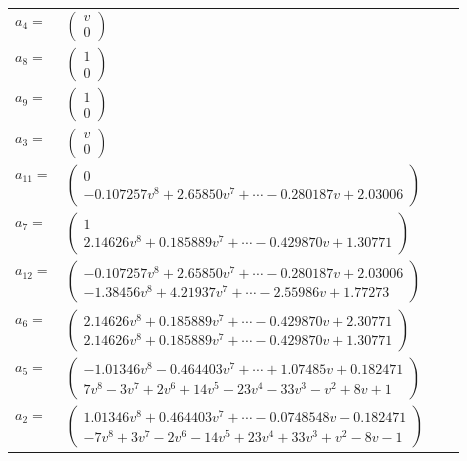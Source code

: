 \documentclass[1p]{elsarticle_modified}
\theoremstyle{definition}
\begin{document}
\begin{tabular}{m{7pt} m{180pt} m{7pt} m{180pt} }
\flushright $a_{4}=$&$\begin{pmatrix}v\\0\end{pmatrix}$ \\
\flushright $a_{8}=$&$\begin{pmatrix}1\\0\end{pmatrix}$ \\
\flushright $a_{9}=$&$\begin{pmatrix}1\\0\end{pmatrix}$ \\
\flushright $a_{3}=$&$\begin{pmatrix}v\\0\end{pmatrix}$ \\
\flushright $a_{11}=$&$\begin{pmatrix}0\\-0.107257 v^{8}+2.65850 v^{7}+\cdots-0.280187 v+2.03006\end{pmatrix}$ \\
\flushright $a_{7}=$&$\begin{pmatrix}1\\2.14626 v^{8}+0.185889 v^{7}+\cdots-0.429870 v+1.30771\end{pmatrix}$ \\
\flushright $a_{12}=$&$\begin{pmatrix}-0.107257 v^{8}+2.65850 v^{7}+\cdots-0.280187 v+2.03006\\-1.38456 v^{8}+4.21937 v^{7}+\cdots-2.55986 v+1.77273\end{pmatrix}$ \\
\flushright $a_{6}=$&$\begin{pmatrix}2.14626 v^{8}+0.185889 v^{7}+\cdots-0.429870 v+2.30771\\2.14626 v^{8}+0.185889 v^{7}+\cdots-0.429870 v+1.30771\end{pmatrix}$ \\
\flushright $a_{5}=$&$\begin{pmatrix}-1.01346 v^{8}-0.464403 v^{7}+\cdots+1.07485 v+0.182471\\7 v^8-3 v^7+2 v^6+14 v^5-23 v^4-33 v^3- v^2+8 v+1\end{pmatrix}$ \\
\flushright $a_{2}=$&$\begin{pmatrix}1.01346 v^{8}+0.464403 v^{7}+\cdots-0.0748548 v-0.182471\\-7 v^8+3 v^7-2 v^6-14 v^5+23 v^4+33 v^3+v^2-8 v-1\end{pmatrix}$ \\

\end{tabular}
\end{document}
